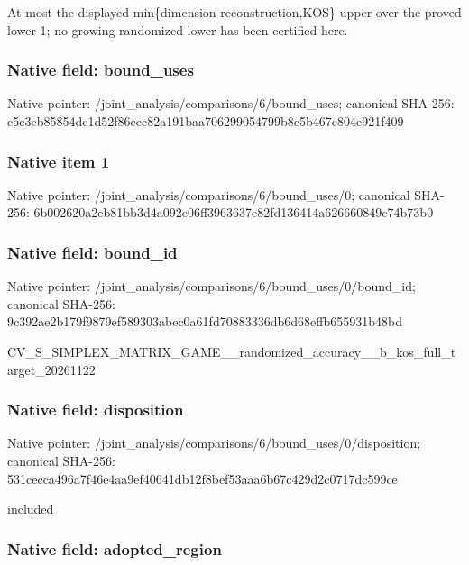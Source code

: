 \documentclass[10pt,a4paper]{article}
\begin{document}
At most the displayed min\{dimension reconstruction,KOS\} upper over the proved lower 1; no growing randomized lower has been certified here.


\subsubsection{Native field: bound\_uses}


Native pointer: /joint\_analysis/comparis\allowbreak{}ons/6/bound\_uses; canonical SHA-256: c5c3eb85854dc1d52f86eec8\allowbreak{}2a191baa706299054799b8c5\allowbreak{}b467c804e921f409



\subsubsection{Native item 1}


Native pointer: /joint\_analysis/comparis\allowbreak{}ons/6/bound\_uses/0; canonical SHA-256: 6b002620a2eb81bb3d4a092e\allowbreak{}06ff3963637e82fd136414a6\allowbreak{}26660849c74b73b0



\subsubsection{Native field: bound\_id}


Native pointer: /joint\_analysis/comparis\allowbreak{}ons/6/bound\_uses/0/bound\allowbreak{}\_id; canonical SHA-256: 9c392ae2b179f9879ef58930\allowbreak{}3abec0a61fd70883336db6d6\allowbreak{}8effb655931b48bd


CV\_S\_SIMPLEX\_MATRIX\_GAME\allowbreak{}\_\_randomized\_accuracy\_\_b\allowbreak{}\_kos\_full\_target\_2026112\allowbreak{}2


\subsubsection{Native field: disposition}


Native pointer: /joint\_analysis/comparis\allowbreak{}ons/6/bound\_uses/0/dispo\allowbreak{}sition; canonical SHA-256: 531cecca496a7f46e4aa9ef4\allowbreak{}0641db12f8bef53aaa6b67c4\allowbreak{}29d2c0717dc599ce


included


\subsubsection{Native field: adopted\_region}
\end{document}
